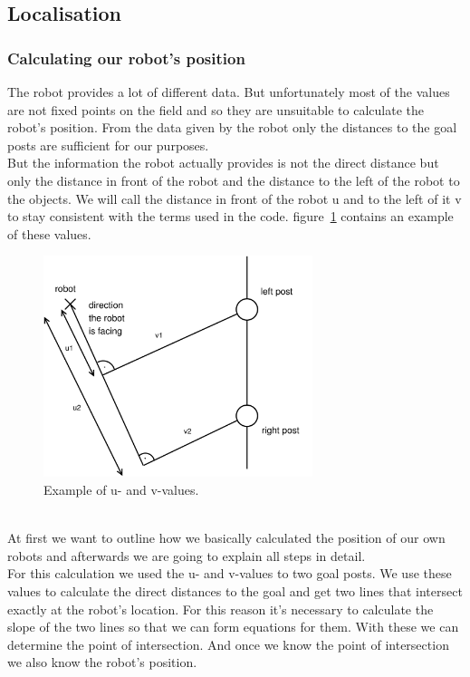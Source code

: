 \documentclass[lnicst,a4paper]{svmultln}
\begin{document}
\subsection{Localisation}

\subsubsection{Calculating our robot's position}
The robot provides a lot of different data.
But unfortunately most of the values are not fixed points on the field and so they are unsuitable to calculate the robot's position. From the data given by the robot only the distances to the goal posts are sufficient for our purposes.
\\
But the information the robot actually provides is not the direct distance but only the distance in front of the robot and the distance to the left of the robot to the objects. We will call the distance in front of the robot u and to the left of it v to stay consistent with the terms used in the code. figure~\ref{fig:uvvalues} contains an example of these values.
\begin{figure}
 	\centerline{\includegraphics[width=0.7\textwidth]{uvvalues.pdf}}
	{\caption{Example of u- and v-values.}\label{fig:uvvalues}}
\end{figure}
\\
At first we want to outline how we basically calculated the position of our own robots and afterwards we are going to explain all steps in detail.
\\
For this calculation we used the u- and v-values to two goal posts. We use these values to calculate the direct distances to the goal and get two lines that intersect exactly at the robot's location. For this reason it's necessary to calculate the slope of the two lines so that we can form equations for them. With these we can determine the point of intersection. And once we know the point of intersection we also know the robot's position.
\end{document}
